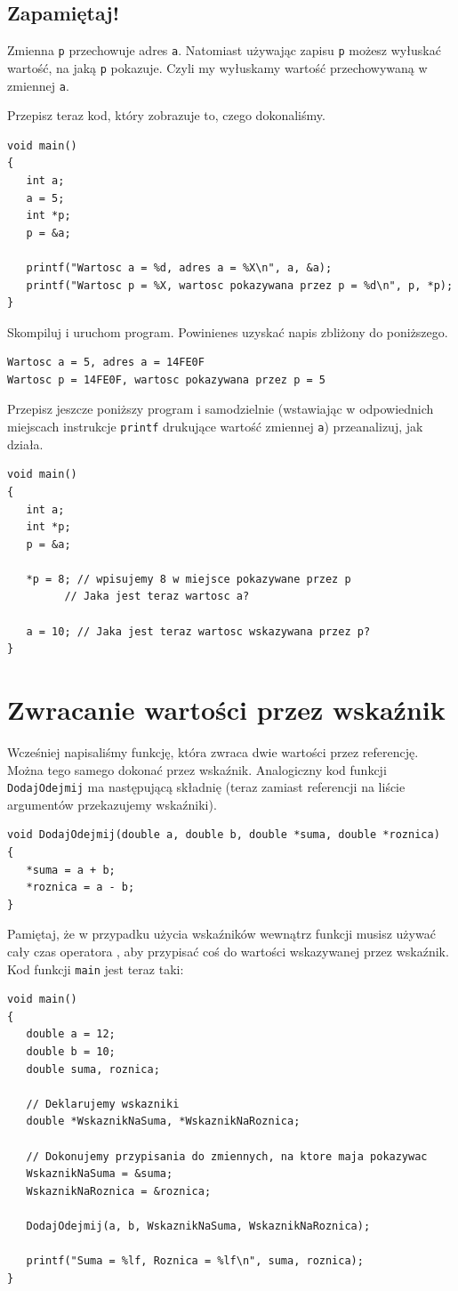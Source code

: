 \documentclass{instrukcja}
\begin{document}
\subsection*{Zapamiętaj!}
Zmienna {\tt p} przechowuje adres {\tt a}. Natomiast używając zapisu {\tt *p} możesz wyłuskać wartość, na jaką {\tt p} pokazuje. Czyli my wyłuskamy wartość przechowywaną w zmiennej {\tt a}.

Przepisz teraz kod, który zobrazuje to, czego dokonaliśmy.
\begin{verbatim}
void main()
{
   int a;
   a = 5;
   int *p;
   p = &a;
   
   printf("Wartosc a = %d, adres a = %X\n", a, &a);
   printf("Wartosc p = %X, wartosc pokazywana przez p = %d\n", p, *p);
}
\end{verbatim}
Skompiluj i uruchom program. Powinienes uzyskać napis zbliżony do poniższego.
\begin{verbatim}
Wartosc a = 5, adres a = 14FE0F
Wartosc p = 14FE0F, wartosc pokazywana przez p = 5
\end{verbatim}

Przepisz jeszcze poniższy program i samodzielnie (wstawiając w odpowiednich miejscach instrukcje {\tt printf} drukujące wartość zmiennej {\tt a}) przeanalizuj, jak działa.
\begin{verbatim}
void main()
{
   int a;
   int *p;
   p = &a;

   *p = 8; // wpisujemy 8 w miejsce pokazywane przez p
         // Jaka jest teraz wartosc a?

   a = 10; // Jaka jest teraz wartosc wskazywana przez p?
}
\end{verbatim}

\section{Zwracanie wartości przez wskaźnik}
Wcześniej napisaliśmy funkcję, która zwraca dwie wartości przez referencję. Można tego samego dokonać przez wskaźnik. Analogiczny kod funkcji {\tt DodajOdejmij} ma następującą składnię (teraz zamiast referencji na liście argumentów przekazujemy wskaźniki).
\begin{verbatim}
void DodajOdejmij(double a, double b, double *suma, double *roznica)
{
   *suma = a + b;
   *roznica = a - b;
}
\end{verbatim}
Pamiętaj, że w przypadku użycia wskaźników wewnątrz funkcji musisz używać cały czas operatora {\tt *}, aby przypisać coś do wartości wskazywanej przez wskaźnik. Kod funkcji {\tt main} jest teraz taki:
\begin{verbatim}
void main()
{
   double a = 12;
   double b = 10;
   double suma, roznica;

   // Deklarujemy wskazniki
   double *WskaznikNaSuma, *WskaznikNaRoznica;

   // Dokonujemy przypisania do zmiennych, na ktore maja pokazywac
   WskaznikNaSuma = &suma;
   WskaznikNaRoznica = &roznica;

   DodajOdejmij(a, b, WskaznikNaSuma, WskaznikNaRoznica);

   printf("Suma = %lf, Roznica = %lf\n", suma, roznica);
}
\end{verbatim}
\end{document}
